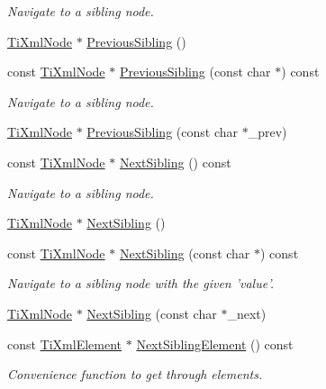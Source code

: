 \begin{DoxyCompactItemize}
\begin{DoxyCompactList}\small\item\em Navigate to a sibling node. \item\end{DoxyCompactList}\item 
\hyperlink{classTiXmlNode}{TiXmlNode} $\ast$ \hyperlink{classTiXmlNode_af8c0642ad6ecc03f62953e68896ed1cc}{PreviousSibling} ()
\item 
const \hyperlink{classTiXmlNode}{TiXmlNode} $\ast$ \hyperlink{classTiXmlNode_abbb3b8c1f38fa7b9e52d584a4aeca795}{PreviousSibling} (const char $\ast$) const 
\begin{DoxyCompactList}\small\item\em Navigate to a sibling node. \item\end{DoxyCompactList}\item 
\hyperlink{classTiXmlNode}{TiXmlNode} $\ast$ \hyperlink{classTiXmlNode_a6c977049207177ef21b51972315c2053}{PreviousSibling} (const char $\ast$\_\-prev)
\item 
const \hyperlink{classTiXmlNode}{TiXmlNode} $\ast$ \hyperlink{classTiXmlNode_af854baeba384f5fe9859f5aee03b548e}{NextSibling} () const 
\begin{DoxyCompactList}\small\item\em Navigate to a sibling node. \item\end{DoxyCompactList}\item 
\hyperlink{classTiXmlNode}{TiXmlNode} $\ast$ \hyperlink{classTiXmlNode_a4d05f7b1d7b470ac6887edd072d4892a}{NextSibling} ()
\item 
const \hyperlink{classTiXmlNode}{TiXmlNode} $\ast$ \hyperlink{classTiXmlNode_acaf9dc17531ac041f602f9ad579573ea}{NextSibling} (const char $\ast$) const 
\begin{DoxyCompactList}\small\item\em Navigate to a sibling node with the given 'value'. \item\end{DoxyCompactList}\item 
\hyperlink{classTiXmlNode}{TiXmlNode} $\ast$ \hyperlink{classTiXmlNode_a4080bc5cc8a5c139e7cf308669e850fc}{NextSibling} (const char $\ast$\_\-next)
\item 
const \hyperlink{classTiXmlElement}{TiXmlElement} $\ast$ \hyperlink{classTiXmlNode_a7667217e269e0da01d1f82aee94d1a3d}{NextSiblingElement} () const 
\begin{DoxyCompactList}\small\item\em Convenience function to get through elements. \item\end{DoxyCompactList}\item 

\end{DoxyCompactItemize}
